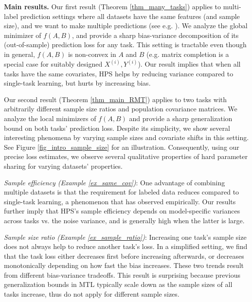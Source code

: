 \textbf{Main results.}
Our first result (Theorem \ref{thm_many_tasks}) applies to multi-label prediction settings where all datasets have the same features (and sample size), and we want to make multiple predictions (see e.g. \cite{hsu2009multi}).
We analyze the global minimizer of $f(A, B)$, and provide a sharp bias-variance decomposition of its (out-of-sample) prediction loss for any task.
This setting is tractable even though in general, $f(A, B)$ is non-convex in $A$ and $B$ (e.g. matrix completion is a special case for suitably designed $X^{(i)}, Y^{(i)}$).
Our result implies that when all tasks have the same covariates, HPS helps by reducing variance compared to single-task learning, but hurts by increasing bias.

Our second result (Theorem \ref{thm_main_RMT}) applies to two tasks with arbitrarily different sample size ratios and population covariance matrices.
We analyze the local minimizers of $f(A, B)$ and provide a sharp generalization bound on both tasks' prediction loss.
Despite its simplicity, we show several interesting phenomena by varying sample sizes and covariate shifts in this setting.
See Figure \ref{fig_intro_sample_size} for an illustration.
Consequently, using our precise loss estimates, we observe several qualitative properties of hard parameter sharing for varying datasets' properties.

\textit{Sample efficiency (Example \ref{ex_same_cov})}:
	One advantage of combining multiple datasets is that the requirement for labeled data reduces compared to single-task learning, a phenomenon that \citet{ZSSGM18} has observed empirically.
	Our results further imply that HPS's sample efficiency depends on model-specific variances across tasks vs. the noise variance, and is generally high when the latter is large.

\textit{Sample size ratio (Example \ref{ex_sample_ratio})}: Increasing one task's sample size does not always help to reduce another task's loss. In a simplified setting, we find that the task loss either decreases first before increasing afterwards, or decreases monotonically depending on how fast the bias increases. These two trends result from different bias-variance tradeoffs. This result is surprising because previous generalization bounds in MTL typically scale down as the sample sizes of all tasks increase, thus do not apply for different sample sizes.

